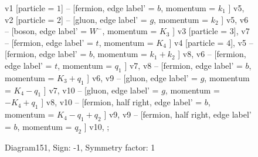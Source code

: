 \documentclass{revtex4}
\begin{document}
\begin{figure}[!htb]
\begin{center}
{    %
v1 [particle = \(1\)] -- [fermion, edge label' = \(b\), momentum = \(k_{1}\) ] v5, 
v2 [particle = \(2\)] -- [gluon, edge label' = \(g\), momentum = \(k_{2}\) ] v5, 
v6 -- [boson, edge label' = \(W^{-}\), momentum = \(K_{3}\) ] v3 [particle = \(3\)], 
v7 -- [fermion, edge label' = \(t\), momentum = \(K_{4}\) ] v4 [particle = \(4\)], 
v5 -- [fermion, edge label' = \(b\), momentum = \(k_{1} + k_{2}\) ] v8, 
v6 -- [fermion, edge label' = \(t\), momentum = \(q_{1}\) ] v7, 
v8 -- [fermion, edge label' = \(b\), momentum = \(K_{3} + q_{1}\) ] v6, 
v9 -- [gluon, edge label' = \(g\), momentum = \(K_{4} - q_{1}\) ] v7, 
v10 -- [gluon, edge label' = \(g\), momentum = \(-K_{4} + q_{1}\) ] v8, 
v10 -- [fermion, half right, edge label' = \(b\), momentum = \(K_{4} - q_{1} + q_{2}\) ] v9, 
v9 -- [fermion, half right, edge label' = \(b\), momentum = \(q_{2}\) ] v10, 
};
\end{center}
\caption{Diagram151, Sign: -1, Symmetry factor: 1}
\end{figure}
\newpage
\end{document}
